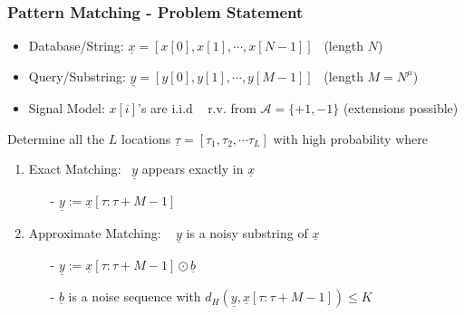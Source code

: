 \documentclass[10pt,xcolor=table]{beamer}
\newcommand{\xv}{\underline{x}}
\newcommand{\bv}{\underline{b}}
\newcommand{\yv}{\underline{y}}
\begin{document}
\begin{frame}\frametitle{Pattern Matching - Problem Statement}
\vspace{-10pt}
	\begin{figure}
	\centering
	\scalebox{0.45}{}
\end{figure}
	\vspace{-5pt}
	\begin{block}{}
\begin{itemize}\itemsep5pt
	\item {\color{blue} Database/String}: $\xv = [x[0], x[1], \cdots, x[N-1]]$ \ (length $N$)
	\item { \color{blue} Query/Substring}: $\yv = [y[0], y[1], \cdots, y[M-1]]$ \ (length $M = N^\mu$)
	\item {\color{blue} Signal Model:} $x[i]$'s are i.i.d ~ r.v. from $\mathcal{A} = \{+1,-1\}$ (extensions possible)
\end{itemize}
\end{block}

\vspace{-3pt}
\pause
\begin{block}{}
Determine all the {\color{blue} $L$ locations} $\underline{\tau} = [\tau_1, \tau_2, \cdots \tau_L]$ with  {\color{blue}high probability}  where
	\begin{enumerate}
		\item \alert{Exact Matching}:~  $\yv$ appears {\color{blue}exactly} in $\xv$
		\begin{itemize}
				\item [-]  $\yv := \xv[\tau:\tau+M-1]$
		\end{itemize}
        \pause
		\item \alert{Approximate Matching:} ~ $\yv$ is a {\color{blue}noisy substring} of $\xv$
		\begin{itemize}\itemsep3pt
				\item [-] $\yv := \xv[\tau:\tau+M-1] \odot \bv$
				\item [-] $\bv$ is a noise sequence with $d_H(\yv,\xv[\tau:\tau+M-1]) \leq K$
		\end{itemize}
	\end{enumerate}

	\end{block}
	 \end{frame}
\end{document}
